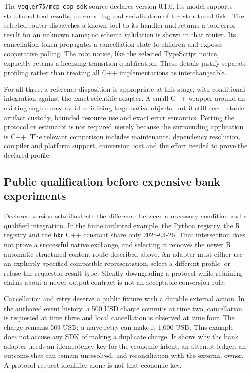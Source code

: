The \texttt{vogler75/mcp-cpp-sdk} source declares version 0.1.0. Its model
supports structured tool results, an error flag and serialization of the
structured field. The selected router dispatches a known tool to its handler
and returns a tool-error result for an unknown name; no schema validation is
shown in that router. Its cancellation token propagates a cancellation state
to children and exposes cooperative polling. The root notice, like the
selected TypeScript notice, explicitly retains a licensing-transition
qualification. These details justify separate profiling rather than treating
all C++ implementations as interchangeable.
\citep{exec24_mcp_cpp_vogler}

For all three, a reference disposition is appropriate at this stage, with
conditional integration against the exact scientific adapter. A small C++
wrapper around an existing engine may avoid serializing large native objects,
but it still needs stable artifact custody, bounded resource use and exact
error semantics. Porting the protocol or estimator is not required merely
because the surrounding application is C++. The relevant comparison includes
maintenance, dependency resolution, compiler and platform support, conversion
cost and the effort needed to prove the declared profile.
\citep{exec24_mcp_contracts}

\subsection{Public qualification before expensive bank experiments}

Declared version sets illustrate the difference between a necessary condition
and a qualified integration. In the finite authored example, the Python
registry, the R registry and the hkr C++ constant share only 2025-03-26.
That intersection does not prove a successful native exchange, and selecting
it removes the newer R automatic structured-content route described above.
An adapter must either use an explicitly specified compatible representation,
select a different profile, or refuse the requested result type. Silently
downgrading a protocol while retaining claims about a newer output contract
is not an acceptable conversion rule.\citep{exec24_mcp_python,
exec24_mcp_r,exec24_mcp_cpp_hkr,exec24_mcp_contracts}

Cancellation and retry deserve a public fixture with a durable external
action. In the authored event history, a 500 USD charge commits at time two,
cancellation is requested at time three and local cancellation is observed
at time four. The charge remains 500 USD; a naive retry can make it 1,000 USD.
This example does not accuse any SDK of making a duplicate charge. It shows
why the bank adapter needs an idempotency key for the economic intent, an
attempt ledger, an outcome that can remain unresolved, and reconciliation
with the external owner. A protocol request identifier alone is not that
economic key.\citep{exec24_mcp_contracts}

